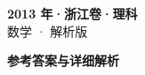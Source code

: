 \documentclass[zihao=-4, a4paper]{ctexart}
\begin{document}
\begin{center}
  {\Large\bfseries 2013 年·浙江卷·理科}\\[4pt]
  {\large 数学 · 解析版}
\end{center}
\medskip
{}

\clearpage
{}
\begin{center}{\Large\bfseries 参考答案与详细解析}\end{center}
\medskip

\end{document}
